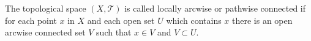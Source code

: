 The topological space $(X, \mathcal{T})$ is called locally arcwise or pathwise connected if for each point $x$ in $X$ and each open set $U$ which contains $x$ there is an open arcwise connected set $V$ such that $x \in V$ and $V \subset U$.
